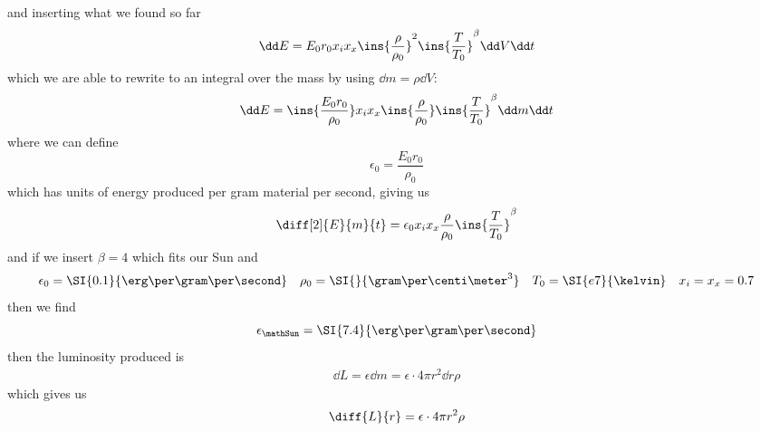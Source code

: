 and inserting what we found so far
\begin{equation}
	\dd E = E_0r_0x_i x_x\ins{\frac{\rho}{\rho_0}}^2\ins{\frac{T}{T_0}}^\beta \dd V \dd t
\end{equation}
which we are able to rewrite to an integral over the mass by using \(\dd m = \rho\dd V\):
\begin{equation}
	\dd E = \ins{\frac{E_0r_0}{\rho_0}}x_i x_x\ins{\frac{\rho}{\rho_0}}\ins{\frac{T}{T_0}}^\beta \dd m \dd t
\end{equation}
where we can define
\begin{equation}
	\epsilon_0 = \frac{E_0r_0}{\rho_0}
\end{equation}
which has units of energy produced per gram material per second, giving us
\begin{equation}
	\diff[2]{E}{m}{t} = \epsilon_0x_i x_x\frac{\rho}{\rho_0}\ins{\frac{T}{T_0}}^\beta
\end{equation}
and if we insert \(\beta=4\) which fits our Sun and
\begin{align}
	\epsilon_0 = \SI{0.1}{\erg\per\gram\per\second} && \rho_0 = \SI{}{\gram\per\centi\meter^3} && T_0 = \SI{e7}{\kelvin} && x_i=x_x=0.7
\end{align}
then we find
\begin{equation}
	\epsilon_\mathSun = \SI{7.4}{\erg\per\gram\per\second}
\end{equation}
then the luminosity produced is
\begin{align}
	\dd L = \epsilon\dd m = \epsilon\cdot 4\pi r^2\dd r\rho
\end{align}
which gives us
\begin{equation}
	\diff{L}{r} = \epsilon\cdot4\pi r^2 \rho
\end{equation}
